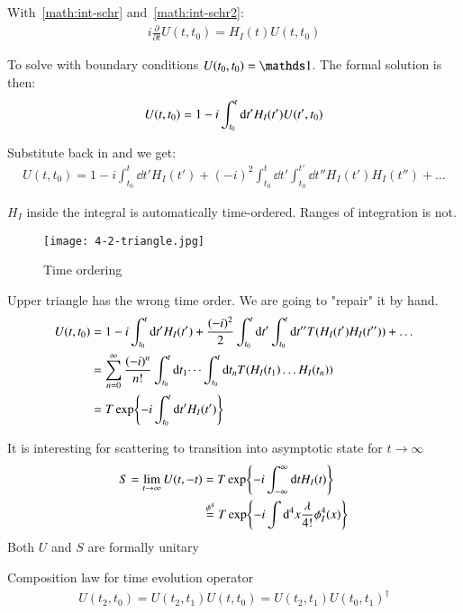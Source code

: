 With~\ref{math:int-schr} and~\ref{math:int-schr2}:
\begin{align}
	i\frac{\partial}{\partial t} U(t,t_0) = H_I(t)U(t,t_0)
\end{align}

To solve with boundary conditions $U(t_0, t_0) = \id$. The formal solution is then:
\begin{align}
	U(t,t_0) = 1 - i \int_{t_0}^t \dd t' H_I(t')U(t',t_0) \notag
\end{align}

Substitute back in and we get:
\begin{align*}
	U(t,t_0) = 1- i \int_{t_0}^t \dd t' H_I(t') + (-i)^2 \int_{t_0}^t \dd t' \int^{t'}_{t_0} \dd t'' H_I(t') H_I(t'') + \dots
\end{align*}

$H_I$ inside the integral is automatically time-ordered. Ranges of integration is not. 

\begin{figure}[ht]
	\centering
	\texttt{[image: 4-2-triangle.jpg]}
	\caption{Time ordering}
	\label{fig:4-2-triangle}
\end{figure}

Upper triangle has the wrong time order. We are going to "repair" it by hand.
\begin{align}
	U(t,t_0) &= 1-i\int_{t_0}^t \dd t' H_I(t') + \frac{(-i)^2}{2} \int_{t_0}^t \dd t' \int^{t}_{t_0} \dd t'' T(H_I(t') H_I(t'')) + \dots \notag\\
			 &= \sum_{n=0}^{\infty} \frac{(-i)^n}{n!}\int_{t_0}^t \dd t_1 \dots \int_{t_0}^t \dd t_n T(H_I(t_1) \dots H_I(t_n))  \notag\\
			 &= T \exp{-i\int_{t_0}^t \dd t' H_I(t') }
\end{align}

It is interesting for scattering to transition into asymptotic state for $t \rightarrow \infty$
\begin{align}
	S = \lim_{t \rightarrow \infty} U(t,-t) &= T \exp{-i \int_{-\infty}^\infty \dd t H_I(t)} \\
	 &\stackrel{\phi^4}{=} T \exp{-i\int \dd^4 x \frac{\lambda}{4!} \phi_I^4(x)} \notag
\end{align}
Both $U$ and $S$ are formally unitary

Composition law for time evolution operator
\begin{align}
	U(t_2, t_0) = U(t_2, t_1) U(t,t_0) = U(t_2, t_1) U(t_0, t_1)^\dagger
\end{align}

